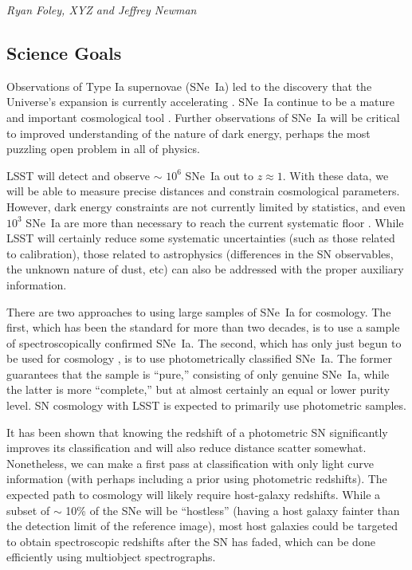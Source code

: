 {\it Ryan Foley, XYZ and Jeffrey Newman }


\subsection{Science Goals}

Observations of Type Ia supernovae (SNe~Ia) led to the discovery that
the Universe's expansion is currently accelerating
\citep{Riess98:Lambda, Perlmutter99}.  SNe~Ia continue to be a mature
and important cosmological tool \citep[e.g.,][]{Suzuki12, Betoule14,
Rest14}.  Further observations of SNe~Ia will be critical to
improved understanding of the nature of dark energy, perhaps the most
puzzling open problem in all of physics.

LSST will detect and observe $\sim$ $10^{6}$ SNe~Ia out to $z \approx
1$.  With these data, we will be able to measure precise distances and
constrain cosmological parameters.  However, dark energy constraints
are not currently limited by statistics, and even $10^{3}$ SNe~Ia are
more than necessary to reach the current systematic floor
\citep{Betoule14, Scolnic14:ps1}.  While LSST will certainly reduce
some systematic uncertainties (such as those related to calibration),
those related to astrophysics (differences in the SN observables, the
unknown nature of dust, etc) can also be addressed with the proper
auxiliary information.

There are two approaches to using large samples of SNe~Ia for
cosmology.  The first, which has been the standard for more than two
decades, is to use a sample of spectroscopically confirmed SNe~Ia.
The second, which has only just begun to be used for cosmology
\citep{Campbell13}, is to use photometrically classified SNe~Ia.  The
former guarantees that the sample is ``pure,'' consisting of only
genuine SNe~Ia, while the latter is more ``complete,'' but at almost
certainly an equal or lower purity level.  SN
cosmology with LSST is expected to primarily use photometric samples.

It has been shown that knowing the redshift of a photometric SN significantly
improves its classification and will also reduce distance scatter
somewhat.  Nonetheless, we can make a first pass at classification with
only light curve information (with perhaps including a prior using
photometric redshifts).  The expected path to cosmology will likely
require host-galaxy redshifts.  While a subset of $\sim$ 10\% of the
SNe will be ``hostless'' (having a host galaxy fainter than the
detection limit of the reference image), most host galaxies could be
targeted to obtain spectroscopic redshifts after the SN has faded, which can be done efficiently using multiobject spectrographs.  

